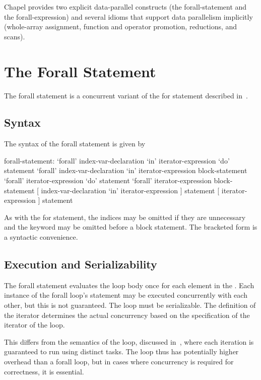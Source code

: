 \label{Data_Parallelism}

Chapel provides two explicit data-parallel constructs (the
forall-statement and the forall-expression) and several idioms that
support data parallelism implicitly (whole-array assignment, function
and operator promotion, reductions, and scans).

\section{The Forall Statement}
\label{Forall}

The forall statement is a concurrent variant of the for statement
described in~.

\subsection{Syntax}
\label{forall_syntax}

The syntax of the forall statement is given by
\begin{syntax}
forall-statement:
  `forall' index-var-declaration `in' iterator-expression `do' statement
  `forall' index-var-declaration `in' iterator-expression block-statement
  `forall' iterator-expression `do' statement
  `forall' iterator-expression block-statement
  [ index-var-declaration `in' iterator-expression ] statement
  [ iterator-expression ] statement
\end{syntax}
As with the for statement, the indices may be omitted if they are
unnecessary and the  keyword may be omitted before a block
statement.  The bracketed form is a syntactic convenience.

\subsection{Execution and Serializability}
\label{forall_semantics}

The forall statement evaluates the loop body once for each element in
the .  Each instance of the forall loop's
statement may be executed concurrently with each other, but this is
not guaranteed.  The loop must be serializable.  The definition of the
iterator determines the actual concurrency based on the specification
of the iterator of the loop.

This differs from the semantics of the  loop, discussed
in~, where each iteration is guaranteed to run using
distinct tasks.  The  loop thus has potentially higher
overhead than a forall loop, but in cases where concurrency is
required for correctness, it is essential.

